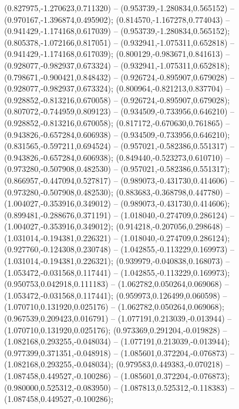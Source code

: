  (0.827975,-1.270623,0.711320) -- (0.953739,-1.280834,0.565152) -- (0.970167,-1.396874,0.495902);
 (0.814570,-1.167278,0.774043) -- (0.941429,-1.174168,0.617039) -- (0.953739,-1.280834,0.565152);
 (0.805378,-1.072166,0.817051) -- (0.932941,-1.075311,0.652818) -- (0.941429,-1.174168,0.617039);
 (0.800129,-0.983671,0.841613) -- (0.928077,-0.982937,0.673324) -- (0.932941,-1.075311,0.652818);
 (0.798671,-0.900421,0.848432) -- (0.926724,-0.895907,0.679028) -- (0.928077,-0.982937,0.673324);
 (0.800964,-0.821213,0.837704) -- (0.928852,-0.813216,0.670058) -- (0.926724,-0.895907,0.679028);
 (0.807072,-0.744959,0.809123) -- (0.934509,-0.733956,0.646210) -- (0.928852,-0.813216,0.670058);
 (0.817172,-0.670630,0.761865) -- (0.943826,-0.657284,0.606938) -- (0.934509,-0.733956,0.646210);
 (0.831565,-0.597211,0.694524) -- (0.957021,-0.582386,0.551317) -- (0.943826,-0.657284,0.606938);
 (0.849440,-0.523273,0.610710) -- (0.973280,-0.507908,0.482530) -- (0.957021,-0.582386,0.551317);
 (0.866957,-0.447094,0.527817) -- (0.989073,-0.431730,0.414606) -- (0.973280,-0.507908,0.482530);
 (0.883683,-0.368798,0.447780) -- (1.004027,-0.353916,0.349012) -- (0.989073,-0.431730,0.414606);
 (0.899481,-0.288676,0.371191) -- (1.018040,-0.274709,0.286124) -- (1.004027,-0.353916,0.349012);
 (0.914218,-0.207056,0.298648) -- (1.031014,-0.194381,0.226321) -- (1.018040,-0.274709,0.286124);
 (0.927760,-0.124308,0.230748) -- (1.042855,-0.113229,0.169973) -- (1.031014,-0.194381,0.226321);
 (0.939979,-0.040838,0.168073) -- (1.053472,-0.031568,0.117441) -- (1.042855,-0.113229,0.169973);
 (0.950753,0.042918,0.111183) -- (1.062782,0.050264,0.069068) -- (1.053472,-0.031568,0.117441);
 (0.959973,0.126499,0.060598) -- (1.070710,0.131920,0.025176) -- (1.062782,0.050264,0.069068);
 (0.967539,0.209423,0.016791) -- (1.077191,0.213039,-0.013944) -- (1.070710,0.131920,0.025176);
 (0.973369,0.291204,-0.019828) -- (1.082168,0.293255,-0.048034) -- (1.077191,0.213039,-0.013944);
 (0.977399,0.371351,-0.048918) -- (1.085601,0.372204,-0.076873) -- (1.082168,0.293255,-0.048034);
 (0.979583,0.449383,-0.070218) -- (1.087458,0.449527,-0.100286) -- (1.085601,0.372204,-0.076873);
 (0.980000,0.525312,-0.083950) -- (1.087813,0.525312,-0.118383) -- (1.087458,0.449527,-0.100286);

